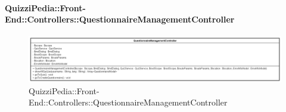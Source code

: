 \paragraph[QuizziPedia::Front-End::Controllers\\::QuestionnaireManagementController]{QuizziPedia::Front-End::Controllers::QuestionnaireManagementController}
\begin{figure} [ht]
	\centering
	\includegraphics[scale=0.6]{UML/Classi/Front-End/QuizziPedia_Front-end_Controller_QuestionnaireManagementController.png}
	\caption{QuizziPedia::Front-End::Controllers::QuestionnaireManagementController}
\end{figure} \FloatBarrier
